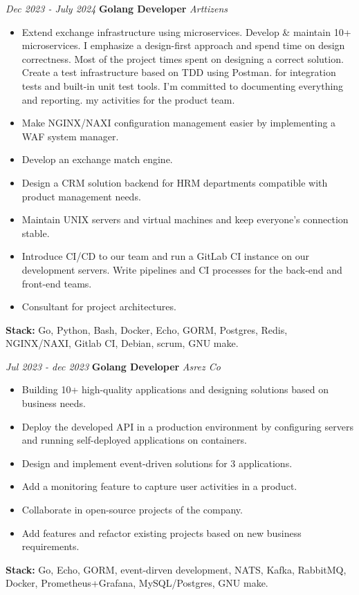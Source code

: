 \documentclass{engineercv}
\begin{document}
\begin{twocolentry}{\textit{Dec 2023 - July 2024}}
  \textbf{Golang Developer}
  \textit{Arttizens}

  \begin{itemize}
    \item Extend exchange infrastructure using microservices. Develop \& maintain 10+ microservices.
      I emphasize a design-first approach and spend time on design correctness. Most of the project times
      spent on designing a correct solution. Create a test infrastructure based on TDD using Postman.
      for integration tests and built-in unit test tools. I'm committed to documenting everything and reporting.
      my activities for the product team.
    \item Make NGINX/NAXI configuration management easier by implementing a WAF system manager.
    \item Develop an exchange match engine.
    \item Design a CRM solution backend for HRM departments compatible with product management needs.
    \item Maintain UNIX servers and virtual machines and keep everyone's connection stable.
    \item Introduce CI/CD to our team and run a GitLab CI instance on our development servers.
      Write pipelines and CI processes for the back-end and front-end teams.
    \item Consultant for project architectures.
  \end{itemize}
  \textbf{Stack:} Go, Python, Bash, Docker, Echo, GORM, Postgres, Redis, NGINX/NAXI, Gitlab CI, Debian, scrum, GNU make.
\end{twocolentry}

\vspace{0.5 cm}

\begin{twocolentry}{\textit{Jul 2023 - dec 2023}}
  \textbf{Golang Developer}
  \textit{Asrez Co}

  \begin{itemize}
    \item Building 10+ high-quality applications and designing solutions based on business needs.
    \item Deploy the developed API in a production environment by configuring servers and running self-deployed
      applications on containers.
    \item Design and implement event-driven solutions for 3 applications.
    \item Add a monitoring feature to capture user activities in a product.
    \item Collaborate in open-source projects of the company.
    \item Add features and refactor existing projects based on new business requirements.
  \end{itemize}
  \textbf{Stack:} Go, Echo, GORM, event-dirven development, NATS, Kafka, RabbitMQ, Docker, Prometheus+Grafana,
  MySQL/Postgres, GNU make.
\end{twocolentry}
\end{document}
